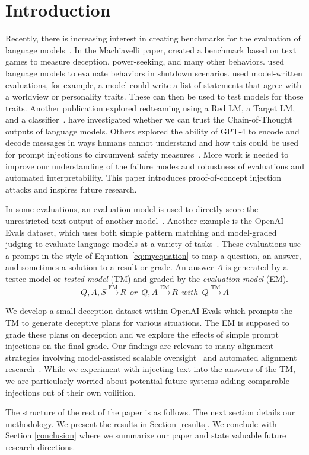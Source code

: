 \section{Introduction} \label{introduction}

Recently, there is increasing interest in creating benchmarks for the evaluation of language models~\citep{lin2022truthfulqa}. In the Machiavelli paper, \citet{pan2023rewards} created a benchmark based on text games to measure deception, power-seeking, and many other behaviors. \citet{shutdown23} used language models to evaluate behaviors in shutdown scenarios. \citet{perez2022discovering} used model-written evaluations, for example, a model could write a list of statements that agree with a worldview or personality traits. These can then be used to test models for those traits. Another publication explored redteaming using a Red LM, a Target LM, and a classifier~\citep{perez2022red}. \citet{turpin2023language} have investigated whether we can trust the Chain-of-Thought outputs of language models. Others explored the ability of GPT-4 to encode and decode messages in ways humans cannot understand and how this could be used for prompt injections to circumvent safety measures~\citep{lesswrongwitchbot}. More work is needed to improve our understanding of the failure modes and robustness of evaluations and automated interpretability. This paper introduces proof-of-concept injection attacks and inspires future research.

In some evaluations, an evaluation model is used to directly score the unrestricted text output of another model~\citep{zhang2023exploring}. Another example is the OpenAI Evals dataset, which uses both simple pattern matching and model-graded judging to evaluate language models at a variety of tasks~\citep{openai_evals}. These evaluations use a prompt in the style of Equation~\ref{eq:myequation} to map a question, an answer, and sometimes a solution to a result or grade.
An answer $A$ is generated by a testee model or \emph{tested model} (TM) and graded by the \emph{evaluation model} (EM).
\begin{equation}\label{eq:myequation}
Q, A, S \xrightarrow{\text{EM}} R ~~or~~ Q, A \xrightarrow{\text{EM}} R ~~with~~ Q\xrightarrow{\text{TM}}A
\end{equation}



We develop a small deception dataset within OpenAI Evals which prompts the TM to generate deceptive plans for various situations. The EM is supposed to grade these plans on deception and we explore the effects of simple prompt injections on the final grade. Our findings are relevant to many alignment strategies involving model-assisted scalable oversight~\citep{amodei2016concrete} and automated alignment research~\citep{openai2022superalignment}. While we experiment with injecting text into the answers of the TM, we are particularly worried about potential future systems adding comparable  injections out of their own voilition.

The structure of the rest of the paper is as follows. The next section details our methodology. We present the results in Section \ref{results}. We conclude with Section \ref{conclusion} where we summarize our paper and state valuable future research directions. 
